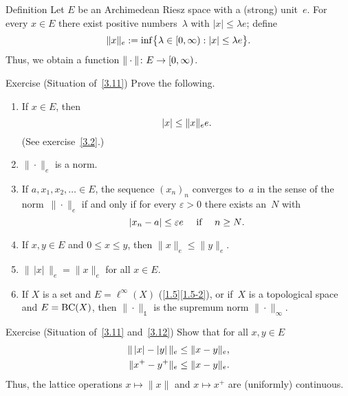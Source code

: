 \documentclass[main.tex]{subfiles}
\begin{document}
%
%
\begin{psec}{3.11}{Definition}
Let $E$ be an Archimedean Riesz space
with a (strong) unit~$e$.
For every $x\in E$
there exist positive numbers~$\lambda$
with $|x|\leq \lambda e$;
define
\begin{equation*}
\| x \|_e := \inf\bigl\{ \lambda\in[0,\infty): |x|\leq \lambda e\bigr\}\text{.}
\end{equation*}
Thus, we obtain a function $\|\cdot\|\colon E \rightarrow [0,\infty)$.
\end{psec}
%
%
\begin{psec}{3.12}{Exercise}
(Situation of~\ref{3.11}) Prove the following.
\begin{enumerate}
\item \label{3.12-1}
If $x\in E$, then 
\begin{equation*}
|x|\leq \|x\|_e e\text{.}
\end{equation*}
(See exercise~\ref{3.2}.)
%
\item \label{3.12-2}
$\|\cdot\|_e$ is a norm.
%
\item \label{3.12-3}
If $a,x_1,x_2,\dotsc\in E$,
the sequence $(x_n)_n$
converges to~$a$ in the sense
of the norm~$\|\cdot\|_e$
if and only if 
for every $\varepsilon>0$ there exists 
an~$N$ with
\begin{equation*}
|x_n-a|\leq \varepsilon e \quad\text{ if }\quad n\geq N\text{.} 
\end{equation*}
%
\item \label{3.12-4}
If $x,y\in E$ and $0\leq x\leq y$,
then $\|x\|_e \leq \|y\|_e$.
%
\item \label{3.12-5}
$\| \, | x|\, \|_e=\| x \|_e$ for all $x\in E$.
%
\item \label{3.12-6}
If $X$ is a set and $E=\ell^\infty(X)$
(\ref{1.5}\ref{1.5-2}),
or if~$X$ is a topological space 
and $E=\mathrm{BC}(X)$,
then $\|\cdot\|_\mathbb{1}$ 
is the supremum norm $\|\cdot\|_\infty$.
\end{enumerate}
\end{psec}
%
%
\begin{psec}{3.13}{Exercise}
(Situation of~\ref{3.11} and~\ref{3.12})
Show that for all $x,y\in E$
\begin{align*}
\|\,|x|-|y|\,\|_e & \leq \|x-y\|_e\text{,}\\
\| x^+ - y^+ \|_e & \leq \|x-y\|_e\text{.}
\end{align*}
Thus, the lattice operations $x\mapsto \| x\|$
and $x\mapsto x^+$
are (uniformly) continuous.
\end{psec}
\clearpage
\end{document}
